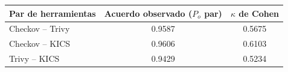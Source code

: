 \begin{tabular}{lcc}
\toprule
Par de herramientas & Acuerdo observado ($P_o$ par) & $\kappa$ de Cohen \\
\midrule
Checkov -- Trivy & 0.9587 & 0.5675 \\
Checkov -- KICS & 0.9606 & 0.6103 \\
Trivy -- KICS & 0.9429 & 0.5234 \\
\bottomrule
\end{tabular}

